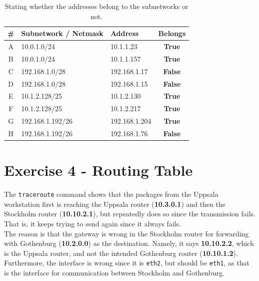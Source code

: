 \documentclass[10pt]{article}
\begin{document}
\begin{table}[H]
\centering
  \begin{tabular}{| c | l | l | c |}
    \hline
    \textbf{\#} & \textbf{Subnetwork / Netmask} & \textbf{Address} & \textbf{Belongs} \\\hline
    A & 10.0.1.0/24 & 10.1.1.23 & {\color{teal}\textbf{True}} \\ \hline
    B & 10.0.1.0/24 & 10.1.1.157 & {\color{teal}\textbf{True}} \\ \hline
    C & 192.168.1.0/28 & 192.168.1.17 & {\color{purple}\textbf{False}} \\ \hline
    D & 192.168.1.0/28 & 192.168.1.15 & {\color{purple}\textbf{False}} \\ \hline
    E & 10.1.2.128/25 & 10.1.2.130 & {\color{teal}\textbf{True}} \\ \hline
    F & 10.1.2.128/25 & 10.1.2.217 & {\color{teal}\textbf{True}} \\ \hline
    G & 192.168.1.192/26 & 192.168.1.204 & {\color{teal}\textbf{True}} \\ \hline
    H & 192.168.1.192/26 & 192.168.1.76 & {\color{purple}\textbf{False}} \\ \hline
  \end{tabular}
  \caption{Stating whether the addresses belong to the subnetworks or not.}
  \label{table:belonging}
\end{table}
\section{Exercise 4 - Routing Table}
The \texttt{traceroute} command shows that the packages from the Uppsala workstation first is reaching the Uppsala router (\textbf{10.3.0.1}) and then the Stockholm router (\textbf{10.10.2.1}), but repeatedly does so since the transmission fails. That is, it keeps trying to send again since it always fails. \\

The reason is that the gateway is wrong in the Stockholm router for forwarding with Gothenburg (\textbf{10.2.0.0}) as the destination. Namely, it says \textbf{10.10.2.2}, which is the Uppsala router, and not the intended Gothenburg router (\textbf{10.10.1.2}). Furthermore, the interface is wrong since it is \texttt{eth2}, but should be \texttt{eth1}, as that is the interface for communication between Stockholm and Gothenburg.
\end{document}
